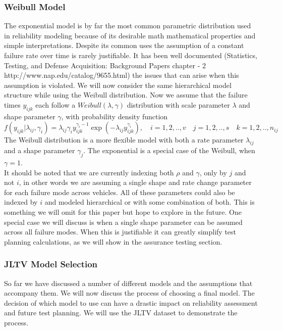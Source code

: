 \documentclass[12pt]{article}
\begin{document}
\subsubsection{Weibull Model}
The exponential model is by far the most common parametric distribution used in
reliability modeling because of its desirable math mathematical properties and
simple interpretations.   Despite its common uses the assumption of a constant
failure rate over time is rarely justifiable.  It has been well documented
(Statistics, Testing, and Defense Acquisition: Background Papers chapter - 2
http://www.nap.edu/catalog/9655.html) the issues that can arise when this
assumption is violated.  We will now consider the same hierarchical model
structure while using the Weibull distribution.  Now we assume that the failure
times $y_{ijk}$ each follow a $Weibull(\lambda, \gamma)$ distribution with scale
parameter $\lambda$ and shape parameter $\gamma$, with probability density
function
\begin{equation}
f(y_{ijk}|\lambda_{ij},\gamma_{i})=\lambda_{ij}\gamma_{i} y_{ijk}^{\gamma_{i}-1}\exp(-\lambda_{ij}
y_{ijk}^{\gamma_{i}}), \quad i = 1,2,..,v \quad j=1,2,..,s \quad k=1,2,..,n_{ij}
\end{equation}
The Weibull distribution is a more flexible model with both a rate parameter
$\lambda_{ij}$ and a shape parameter $\gamma_{j}$.  The exponential is a special
case of the Weibull, when $\gamma = 1$.
\\
It should be noted that we are currently indexing both $\rho$ and $\gamma$, only
by $j$ and not $i$, in other words we are assuming a single shape and rate
change parameter for each failure mode across vehicles.  All of these parameters
could also be indexed by $i$ and modeled hierarchical or with some combination
of both.  This is something we will omit for this paper but hope to explore in
the future.  One special case we will discuss is when a single shape parameter
can be assumed across all failure modes.  When this is justifiable it can
greatly simplify test planning calculations, as we will show in the assurance
testing section.

\subsubsection{JLTV Model Selection}
So far we have discussed a number of different models and the assumptions that
accompany them.  We will now discuss the process of choosing a final model.  The
decision of which model to use can have a drastic impact on reliability
assessment and future test planning.  We will use the JLTV dataset to
demonstrate the process.
\end{document}
